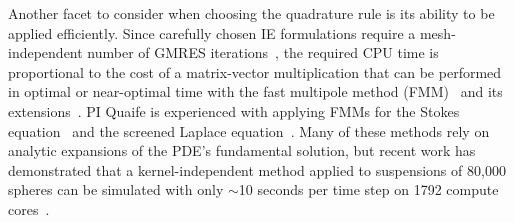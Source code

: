Another facet to consider when choosing the quadrature rule is its
ability to be applied efficiently. Since carefully chosen IE
formulations require a mesh-independent number of GMRES
iterations~\cite{cam-ips-kel-mey-xue1996}, the required CPU time is
proportional to the cost of a matrix-vector multiplication that can be
performed in optimal or near-optimal time with the fast multipole method
(FMM)~\cite{fmm5} and its extensions~\cite{fmm1, fmm2, fmm3, fmm4, fmm6,
fmm7, ros-ols2016}. PI Quaife is experienced with applying FMMs for the
Stokes equation~\cite{qua-bir2014, bys-sha-qua2020} and the screened
Laplace equation~\cite{kro-qua2011, qua2011}. Many of these methods rely
on analytic expansions of the PDE's fundamental solution, but recent
work has demonstrated that a kernel-independent method applied to
suspensions of 80,000 spheres can be simulated with only $\sim$10
seconds per time step on 1792 compute cores~\cite{Yan2019}.

